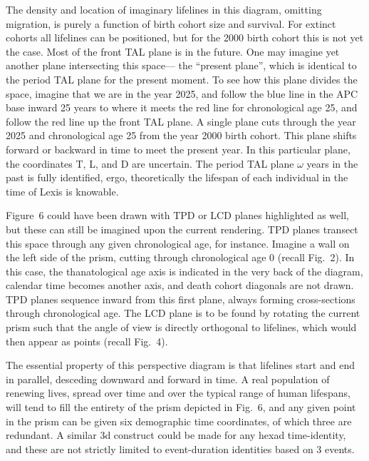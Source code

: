 \documentclass{bmcart}
\theoremstyle{definition}
\begin{document}
The density and location of imaginary lifelines in this diagram, omitting
migration, is purely a function of birth cohort size and survival. For extinct
cohorts all lifelines can be positioned, but for the 2000 birth cohort this is
not yet the case. Most of the front TAL plane is in the future. One may imagine
yet another plane intersecting this space--- the ``present plane'', which is
identical to the period TAL plane for the present moment. To see how this plane
divides the space, imagine that we are in the year 2025, and follow the blue
line in the APC base inward 25 years to where it meets the red line for chronological age 25, and follow the
red line up the front TAL plane. A single plane cuts through the year
2025 and chronological age 25 from the year 2000 birth cohort. This plane
shifts forward or backward in time to meet the present year. In this particular
plane, the coordinates T, L, and D are uncertain. The period TAL plane $\omega$
years in the past is fully identified, ergo, theoretically the lifespan of each
individual in the time of Lexis is knowable. 

Figure~6 could have been drawn with TPD or LCD planes highlighted
as well, but these can still be imagined upon the current rendering. TPD planes
transect this space through any given chronological age, for instance. Imagine a
wall on the left side of the prism, cutting through chronological age 0 (recall
Fig.~2).
In this case, the thanatological age axis is indicated in the very back of the diagram,
calendar time becomes another axis, and death cohort diagonals are not drawn.
TPD planes sequence inward from this first plane, always forming cross-sections
through chronological age. The LCD plane is to be found by rotating the current
prism such that the angle of view is directly orthogonal to lifelines, which
would then appear as points (recall Fig.~4).

The essential property of this perspective diagram is that lifelines
start and end in parallel, desceding downward and forward in time. A real
population of renewing lives, spread over time and over the typical range of
human lifespans, will tend to fill the entirety of the prism depicted in
Fig.~6, and any given point in the prism can be given six
demographic time coordinates, of which three are redundant. A similar 3d
construct could be made for any hexad time-identity, and these are not strictly
limited to event-duration identities based on 3 events.

\FloatBarrier
\end{document}
